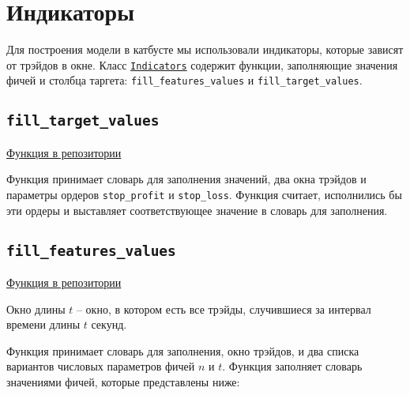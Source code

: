 \section{Индикаторы}

Для построения модели в катбусте мы использовали индикаторы, которые зависят от трэйдов в окне. Класс \href{https://github.com/dexety/dex-trading-system/blob/ca0370d602f2dfa05262b9b8574002f965ac1502/utils/indicators.py#L5}{\texttt{Indicators}} содержит функции, заполняющие значения фичей и столбца таргета: \texttt{fill\_features\_values} и \texttt{fill\_target\_values}.

\subsection{\texttt{fill\_target\_values}}
\href{https://github.com/dexety/dex-trading-system/blob/ca0370d602f2dfa05262b9b8574002f965ac1502/utils/indicators.py#L15}{Функция в репозитории}

Функция принимает словарь для заполнения значений, два окна трэйдов и параметры ордеров \texttt{stop\_profit} и \texttt{stop\_loss}. Функция считает, исполнились бы эти ордеры и выставляет соответствующее значение в словарь для заполнения.

\subsection{\texttt{fill\_features\_values}}
\href{https://github.com/dexety/dex-trading-system/blob/ca0370d602f2dfa05262b9b8574002f965ac1502/utils/indicators.py#L48}{Функция в репозитории}

\begin{proposition}
Окно длины $t$ -- окно, в котором есть все трэйды, случившиеся за интервал времени длины $t$ секунд.
\end{proposition}

Функция принимает словарь для заполнения, окно трэйдов, и два списка вариантов числовых параметров фичей $n$ и $t$. Функция заполняет словарь значениями фичей, которые представлены ниже:

